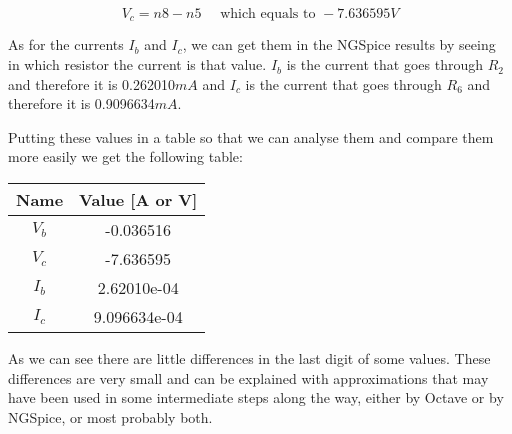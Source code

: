 \begin{equation}
  V_c = n8 - n5 \quad \text{ which equals to } -7.636595V
  \label{eq19}
\end{equation}

As for the currents $I_b$ and $I_c$, we can get them in the NGSpice results by seeing in which resistor the current is that value. $I_b$ is the current that goes through $R_2$ and therefore it is 0.262010$mA$ and $I_c$ is the current that goes through $R_6$ and therefore it is 0.9096634$mA$. \par
Putting these values in a table so that we can analyse them and compare them more easily we get the following table:

\begin{center}
  \begin{tabular}{ | c | c | }
    \hline    
    {\bf Name} & {\bf Value [A or V]} \\ \hline
    $V_b$ & -0.036516 \\ \hline 
    $V_c$ & -7.636595 \\ \hline 
    $I_b$ & 2.62010e-04 \\ \hline 
    $I_c$ & 9.096634e-04 \\ 
    \hline
  \end{tabular}
\end{center}

As we can see there are little differences in the last digit of some values. These differences are very small and can be explained with approximations that may have been used in some intermediate steps along the way, either by Octave or by NGSpice, or most probably both.


